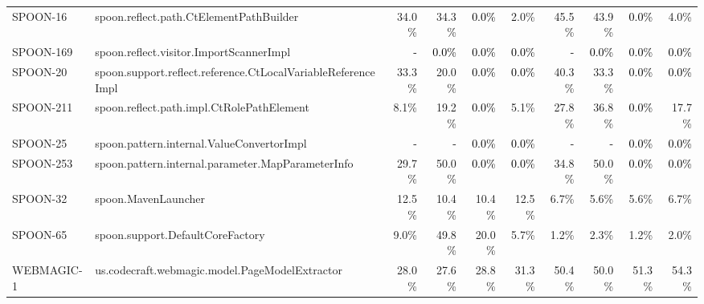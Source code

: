 \begin{tabular}{ ll rrrr rrrr}
SPOON-16  &  spoon.reflect.path.CtElementPathBuilder & 34.0\% & 34.3\% & \cellcolor{light-gray} \textcolor{black}{0.0\%} & 2.0\% & 45.5\% & 43.9\% & \cellcolor{light-gray} \textcolor{black}{0.0\%} & 4.0\%\\ 
SPOON-169  &  spoon.reflect.visitor.ImportScannerImpl & \cellcolor{light-gray} \textcolor{black}{-} & \cellcolor{light-gray} \textcolor{black}{0.0\%} & \cellcolor{light-gray} \textcolor{black}{0.0\%} & \cellcolor{light-gray} \textcolor{black}{0.0\%} & \cellcolor{light-gray} \textcolor{black}{-} & \cellcolor{light-gray} \textcolor{black}{0.0\%} & \cellcolor{light-gray} \textcolor{black}{0.0\%} & \cellcolor{light-gray} \textcolor{black}{0.0\%}\\ 
SPOON-20  &  spoon.support.reflect.reference.CtLocalVariableReferenceImpl & 33.3\% & 20.0\% & \cellcolor{light-gray} \textcolor{black}{0.0\%} & \cellcolor{light-gray} \textcolor{black}{0.0\%} & 40.3\% & 33.3\% & \cellcolor{light-gray} \textcolor{black}{0.0\%} & \cellcolor{light-gray} \textcolor{black}{0.0\%}\\ 
SPOON-211  &  spoon.reflect.path.impl.CtRolePathElement & 8.1\% & 19.2\% & \cellcolor{light-gray} \textcolor{black}{0.0\%} & 5.1\% & 27.8\% & 36.8\% & \cellcolor{light-gray} \textcolor{black}{0.0\%} & 17.7\%\\ 
SPOON-25  &  spoon.pattern.internal.ValueConvertorImpl & \cellcolor{light-gray} \textcolor{black}{-} & \cellcolor{light-gray} \textcolor{black}{-} & \cellcolor{light-gray} \textcolor{black}{0.0\%} & \cellcolor{light-gray} \textcolor{black}{0.0\%} & \cellcolor{light-gray} \textcolor{black}{-} & \cellcolor{light-gray} \textcolor{black}{-} & \cellcolor{light-gray} \textcolor{black}{0.0\%} & \cellcolor{light-gray} \textcolor{black}{0.0\%}\\ 
SPOON-253  &  spoon.pattern.internal.parameter.MapParameterInfo & 29.7\% & 50.0\% & \cellcolor{light-gray} \textcolor{black}{0.0\%} & \cellcolor{light-gray} \textcolor{black}{0.0\%} & 34.8\% & 50.0\% & \cellcolor{light-gray} \textcolor{black}{0.0\%} & \cellcolor{light-gray} \textcolor{black}{0.0\%}\\ 
SPOON-32  &  spoon.MavenLauncher & 12.5\% & 10.4\% & 10.4\% & 12.5\% & 6.7\% & 5.6\% & 5.6\% & 6.7\%\\ 
SPOON-65  &  spoon.support.DefaultCoreFactory & 9.0\% & 49.8\% & 20.0\% & 5.7\% & 1.2\% & 2.3\% & 1.2\% & 2.0\%\\ 
WEBMAGIC-1  &  us.codecraft.webmagic.model.PageModelExtractor & 28.0\% & 27.6\% & 28.8\% & 31.3\% & 50.4\% & 50.0\% & 51.3\% & 54.3\%\\ 

\end{tabular}

